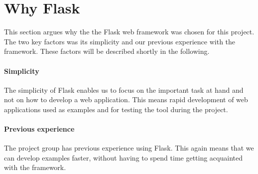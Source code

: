 \section{Why Flask}
This section argues why the the Flask web framework was chosen for this project.
The two key factors was its simplicity and our previous experience with the framework.
These factors will be described shortly in the following.

\paragraph{Simplicity}
The simplicity of Flask enables us to focus on the important task at hand and not on how to develop a web application.
This means rapid development of web applications used as examples and for testing the tool during the project.

\paragraph{Previous experience}
The project group has previous experience using Flask.
This again means that we can develop examples faster, without having to spend time getting acquainted with the framework.


